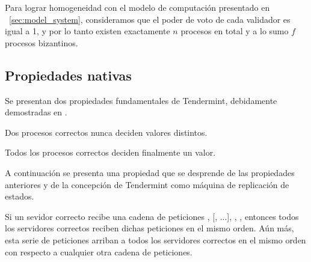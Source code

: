 Para lograr homogeneidad con el modelo de computación presentado en ~\ref{sec:model_system},
consideramos que el poder de voto de cada validador es igual a 1, y por lo tanto existen exactamente
$n$ procesos en total y a lo sumo $f$ procesos bizantinos.
 
\subsection{Propiedades nativas}
Se presentan dos propiedades fundamentales de Tendermint, debidamente demostradas en \cite{Buchman.2018.Tendermint}.

\setcounter{prop:tendermint}{\value{property}}

\begin{property}\label{tendermint:agreement}
  Dos procesos correctos nunca deciden valores distintos.
\end{property}

\begin{property}\label{tendermint:termination}
    Todos los procesos correctos deciden finalmente un valor.
\end{property}

A continuación se presenta una propiedad que se desprende de las propiedades anteriores
y de la concepción de Tendermint
como máquina de replicación de estados.

\begin{property}\label{tendermint:global-delivery}
  Si un sevidor correcto recibe una cadena de peticiones
  \BeginBlock, [\DeliverTx, ...], \EndBlock, \Commit,
  entonces todos los servidores correctos reciben dichas peticiones en el mismo orden.
  Aún más, esta serie de peticiones arriban a todos los servidores correctos en
  el mismo orden con respecto a cualquier otra cadena de peticiones.
\end{property}



